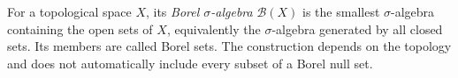 
For a topological space $X$, its \emph{Borel $\sigma$-algebra} $\mathcal B(X)$ is the smallest $\sigma$-algebra containing the open sets of $X$, equivalently the $\sigma$-algebra generated by all closed sets. Its members are called Borel sets. The construction depends on the topology and does not automatically include every subset of a Borel null set.
